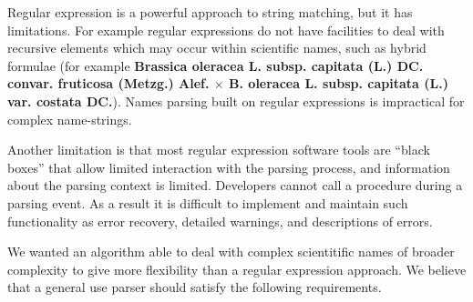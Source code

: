\documentclass{bmcart}
\begin{document}
Regular expression is a powerful approach to string matching, but it has
limitations. For example regular expressions do not have facilities to deal
with recursive elements \cite{yu1997handbook} which may occur within scientific
names, such as hybrid formulae (for example \textbf{Brassica oleracea L.
subsp.  capitata (L.) DC. convar. fruticosa (Metzg.) Alef.  $\times$ B.
oleracea L. subsp. capitata (L.) var.  costata DC.}). Names parsing built on
regular expressions is impractical for complex name-strings.

Another limitation is that most regular expression software tools are ``black
boxes'' that allow limited interaction with the parsing process, and
information about the parsing context is limited. Developers cannot call a
procedure during a parsing event. As a result it is difficult to implement and
maintain such functionality as error recovery, detailed warnings, and
descriptions of errors.

We wanted an algorithm  able to deal with complex scientitific names of broader
complexity to give more flexibility than a regular expression approach.  We
believe that a general use parser should satisfy the following requirements.
\end{document}
